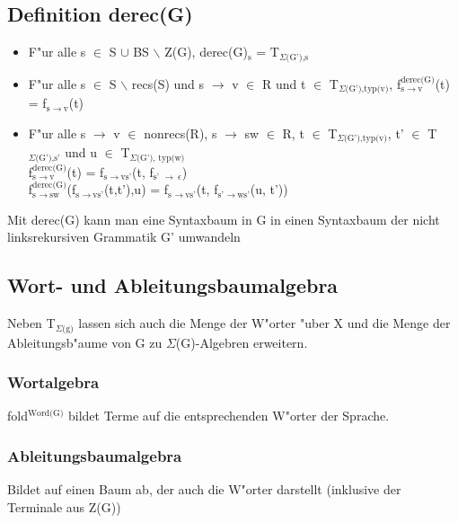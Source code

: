 \documentclass[11pt]{article}
\begin{document}
\subsection{Definition derec(G)}
\label{sec-4-6}

\begin{itemize}
\item F"ur alle s $\in$ S $\cup$ BS $\backslash$ Z(G), derec(G)$_{\text{s}}$ = T$_{\Sigma\text{(G'),s}}$
\item F"ur alle s $\in$ S $\backslash$ recs(S) und s $\to$ v $\in$ R und t $\in$ T$_{\Sigma\text{(G'),typ(v)}}$, f$_{\text{s }\to\ \text{v}}^{\text{derec(G)}}$(t) = f$_{\text{s }\to\ \text{v}}$(t)
\item F"ur alle s $\to$ v $\in$ nonrecs(R), s $\to$ sw $\in$ R, t $\in$ T$_{\Sigma\text{(G'),typ(v)}}$, t' $\in$ T$_{\Sigma\text{(G'),s'}}$ und u $\in$ T$_{\Sigma\text{(G'), typ(w)}}$ \\ f$_{\text{s }\to\ \text{v}}^{\text{derec(G)}}$(t) = f$_{\text{s }\to\ \text{vs'}}$(t, f$_{\text{s' }\to\ \epsilon}$) \\ f$_{\text{s }\to\ \text{sw}}^{\text{derec(G)}}$(f$_{\text{s }\to\ \text{vs'}}$(t,t'),u) = f$_{\text{s }\to\ \text{vs'}}$(t, f$_{\text{s' }\to\ \text{ws'}}$(u, t'))
\end{itemize}

Mit derec(G) kann man eine Syntaxbaum in G in einen Syntaxbaum der nicht linksrekursiven Grammatik G' umwandeln


\subsection{Wort- und Ableitungsbaumalgebra}
\label{sec-4-7}
Neben T$_{\Sigma\text{(g)}}$ lassen sich auch die Menge der W"orter "uber X und die Menge der Ableitungsb"aume von G zu $\Sigma$(G)-Algebren erweitern.

\subsubsection{Wortalgebra}
\label{sec-4-7-1}
fold$^{\text{Word(G)}}$ bildet Terme auf die entsprechenden W"orter der Sprache. 

\subsubsection{Ableitungsbaumalgebra}
\label{sec-4-7-2}
Bildet auf einen Baum ab, der auch die W"orter darstellt (inklusive der Terminale aus Z(G))
\end{document}
